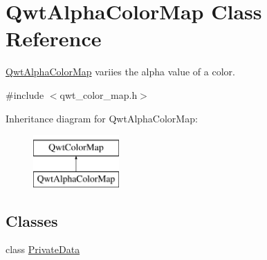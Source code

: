 \hypertarget{class_qwt_alpha_color_map}{\section{Qwt\-Alpha\-Color\-Map Class Reference}
\label{class_qwt_alpha_color_map}
}


\hyperlink{class_qwt_alpha_color_map}{Qwt\-Alpha\-Color\-Map} variies the alpha value of a color.  




{\ttfamily \#include $<$qwt\-\_\-color\-\_\-map.\-h$>$}

Inheritance diagram for Qwt\-Alpha\-Color\-Map\-:\begin{figure}[H]
\begin{center}
\leavevmode
\includegraphics[height=2.000000cm]{class_qwt_alpha_color_map}
\end{center}
\end{figure}
\subsection*{Classes}
\begin{DoxyCompactItemize}
\item 
class \hyperlink{class_qwt_alpha_color_map_1_1_private_data}{Private\-Data}
\end{DoxyCompactItemize}
